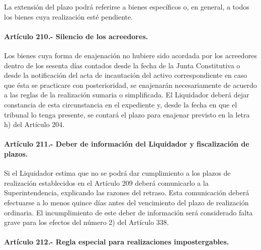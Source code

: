 \documentclass[
]{book}
\begin{document}
La extensión del plazo podrá referirse a bienes específicos o, en general, a todos los bienes cuya realización esté pendiente.

\hypertarget{artuxedculo-210.--silencio-de-los-acreedores.}{%
\paragraph*{Artículo 210.- Silencio de los acreedores.}\label{artuxedculo-210.--silencio-de-los-acreedores.}}

Los bienes cuya forma de enajenación no hubiere sido acordada por los acreedores dentro de los sesenta días contados desde la fecha de la Junta Constitutiva o desde la notificación del acta de incautación del activo correspondiente en caso que ésta se practicare con posterioridad, se enajenarán necesariamente de acuerdo a las reglas de la realización sumaria o simplificada. El Liquidador deberá dejar constancia de esta circunstancia en el expediente y, desde la fecha en que el tribunal lo tenga presente, se contará el plazo para enajenar previsto en la letra h) del Artículo 204.

\hypertarget{artuxedculo-211.--deber-de-informaciuxf3n-del-liquidador-y-fiscalizaciuxf3n-de-plazos.}{%
\paragraph*{Artículo 211.- Deber de información del Liquidador y fiscalización de plazos.}\label{artuxedculo-211.--deber-de-informaciuxf3n-del-liquidador-y-fiscalizaciuxf3n-de-plazos.}}

Si el Liquidador estima que no se podrá dar cumplimiento a los plazos de realización establecidos en el Artículo 209 deberá comunicarlo a la Superintendencia, explicando las razones del retraso. Esta comunicación deberá efectuarse a lo menos quince días antes del vencimiento del plazo de realización ordinaria. El incumplimiento de este deber de información será considerado falta grave para los efectos del número 2) del Artículo 338.

\hypertarget{artuxedculo-212.--regla-especial-para-realizaciones-impostergables.}{%
\paragraph*{Artículo 212.- Regla especial para realizaciones impostergables.}\label{artuxedculo-212.--regla-especial-para-realizaciones-impostergables.}}
\end{document}
